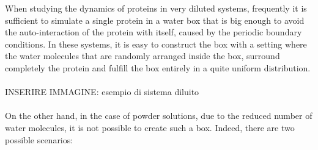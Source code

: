 When studying the dynamics of proteins in very diluted systems, frequently it is sufficient to simulate a single protein in a water box that is big enough to avoid the auto-interaction of the protein with itself, caused by the periodic boundary conditions. In these systems, it is easy to construct the box with a setting where the water molecules that are randomly arranged inside the box, surround completely the protein and fulfill the box entirely in a quite uniform distribution.\\
\\
INSERIRE IMMAGINE: esempio di sistema diluito\\
\\
On the other hand, in the case of powder solutions, due to the reduced number of water molecules, it is not possible to create such a box. Indeed, there are two possible scenarios:
